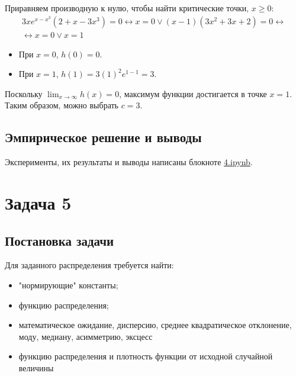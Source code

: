 \documentclass[a4paper,14pt]{extarticle}
\begin{document}
                    Приравняем производную к нулю, чтобы найти критические точки, $x \geq 0$:
                    \begin {gather*}
                            3x e^{x - x^3} (2 + x - 3x^3) = 0 \leftrightarrow
                            x = 0 \lor (x-1)(3x^2 + 3x + 2) = 0 \leftrightarrow \\
                            \leftrightarrow x = 0 \lor x = 1
                    \end{gather*}
                    
                    \begin{itemize}
                            \item При $x=0$, $h(0) = 0$.
                            \item При $x=1$, $h(1) = 3(1)^2 e^{1-1} = 3$.
                    \end{itemize}
                    
                    Поскольку $\lim_{x \to \infty} h(x) = 0$, максимум функции достигается в точке $x=1$.
                    Таким образом, можно выбрать $c = 3$.
        
        \subsection*{Эмпирическое решение и выводы}
            Эксперименты, их результаты и выводы написаны блокноте \href{https://github.com/vorandpav/TVIPS}{4.ipynb}.

    \section*{Задача 5}
        \subsection*{Постановка задачи}
            
            Для заданного распределения требуется найти:
            \begin{itemize}
                \item "нормирующие" константы;
                \item функцию распределения;
                \item математическое ожидание, дисперсию, среднее квадратическое отклонение, моду, медиану, асимметрию, эксцесс
                \item функцию распределения и плотность функции от исходной случайной величины
            \end{itemize}
        
\end{document}
